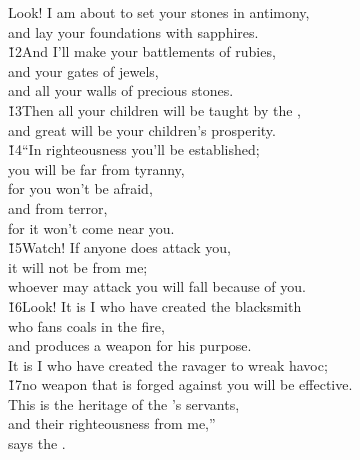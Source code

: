 \begin{poetry}
\poemll    Look! I am about to set your stones in antimony, \\
\poemlll       and lay your foundations with sapphires. \\
\poeml \v{12}And I'll make your battlements of rubies, \\
\poemll    and your gates of jewels, \\
\poemlll       and all your walls of precious stones. \\
\poeml \v{13}Then all your children will be taught by the , \\
\poemll    and great will be your children's prosperity. \\
\poeml \v{14}``In righteousness you'll be established; \\
\poemll    you will be far from tyranny, \\
\poemlll       for you won't be afraid, \\
\poemll    and from terror, \\
\poemlll       for it won't come near you. \\
\poeml \v{15}Watch! If anyone does attack you, \\
\poemll    it will not be from me; \\
\poeml whoever may attack you will fall because of you. \\
\poeml \v{16}Look! It is I who have created the blacksmith \\
\poemll    who fans coals in the fire, \\
\poemlll       and produces a weapon for his purpose. \\
\poeml It is I who have created the ravager to wreak havoc; \\
\poeml \v{17}no weapon that is forged against you will be effective. \\
\poeml This is the heritage of the 's servants, \\
\poemll    and their righteousness from me,'' \\
\poemlll       says the .
\end{poetry}

